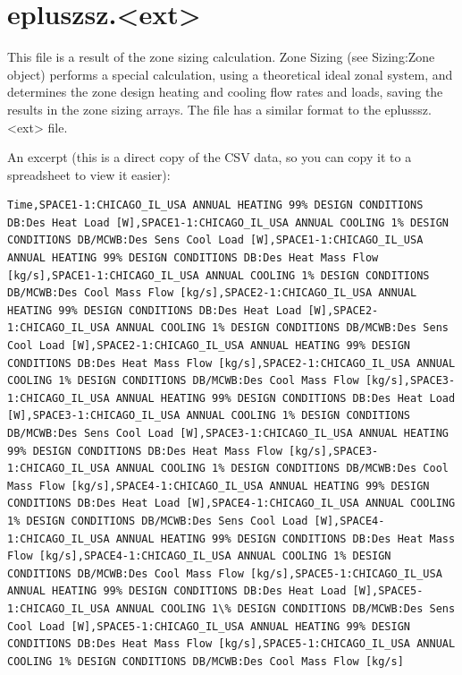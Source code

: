 \section{epluszsz.\textless{}ext\textgreater{}}\label{epluszsz.ext}

This file is a result of the zone sizing calculation. Zone Sizing (see Sizing:Zone object) performs a special calculation, using a theoretical ideal zonal system, and determines the zone design heating and cooling flow rates and loads, saving the results in the zone sizing arrays. The file has a similar format to the eplusssz.\textless{}ext\textgreater{} file.

An excerpt (this is a direct copy of the CSV data, so you can copy it to a spreadsheet to view it easier):

\begin{lstlisting}
Time,SPACE1-1:CHICAGO_IL_USA ANNUAL HEATING 99% DESIGN CONDITIONS DB:Des Heat Load [W],SPACE1-1:CHICAGO_IL_USA ANNUAL COOLING 1% DESIGN CONDITIONS DB/MCWB:Des Sens Cool Load [W],SPACE1-1:CHICAGO_IL_USA ANNUAL HEATING 99% DESIGN CONDITIONS DB:Des Heat Mass Flow [kg/s],SPACE1-1:CHICAGO_IL_USA ANNUAL COOLING 1% DESIGN CONDITIONS DB/MCWB:Des Cool Mass Flow [kg/s],SPACE2-1:CHICAGO_IL_USA ANNUAL HEATING 99% DESIGN CONDITIONS DB:Des Heat Load [W],SPACE2-1:CHICAGO_IL_USA ANNUAL COOLING 1% DESIGN CONDITIONS DB/MCWB:Des Sens Cool Load [W],SPACE2-1:CHICAGO_IL_USA ANNUAL HEATING 99% DESIGN CONDITIONS DB:Des Heat Mass Flow [kg/s],SPACE2-1:CHICAGO_IL_USA ANNUAL COOLING 1% DESIGN CONDITIONS DB/MCWB:Des Cool Mass Flow [kg/s],SPACE3-1:CHICAGO_IL_USA ANNUAL HEATING 99% DESIGN CONDITIONS DB:Des Heat Load [W],SPACE3-1:CHICAGO_IL_USA ANNUAL COOLING 1% DESIGN CONDITIONS DB/MCWB:Des Sens Cool Load [W],SPACE3-1:CHICAGO_IL_USA ANNUAL HEATING 99% DESIGN CONDITIONS DB:Des Heat Mass Flow [kg/s],SPACE3-1:CHICAGO_IL_USA ANNUAL COOLING 1% DESIGN CONDITIONS DB/MCWB:Des Cool Mass Flow [kg/s],SPACE4-1:CHICAGO_IL_USA ANNUAL HEATING 99% DESIGN CONDITIONS DB:Des Heat Load [W],SPACE4-1:CHICAGO_IL_USA ANNUAL COOLING 1% DESIGN CONDITIONS DB/MCWB:Des Sens Cool Load [W],SPACE4-1:CHICAGO_IL_USA ANNUAL HEATING 99% DESIGN CONDITIONS DB:Des Heat Mass Flow [kg/s],SPACE4-1:CHICAGO_IL_USA ANNUAL COOLING 1% DESIGN CONDITIONS DB/MCWB:Des Cool Mass Flow [kg/s],SPACE5-1:CHICAGO_IL_USA ANNUAL HEATING 99% DESIGN CONDITIONS DB:Des Heat Load [W],SPACE5-1:CHICAGO_IL_USA ANNUAL COOLING 1\% DESIGN CONDITIONS DB/MCWB:Des Sens Cool Load [W],SPACE5-1:CHICAGO_IL_USA ANNUAL HEATING 99% DESIGN CONDITIONS DB:Des Heat Mass Flow [kg/s],SPACE5-1:CHICAGO_IL_USA ANNUAL COOLING 1% DESIGN CONDITIONS DB/MCWB:Des Cool Mass Flow [kg/s]


\end{lstlisting}
